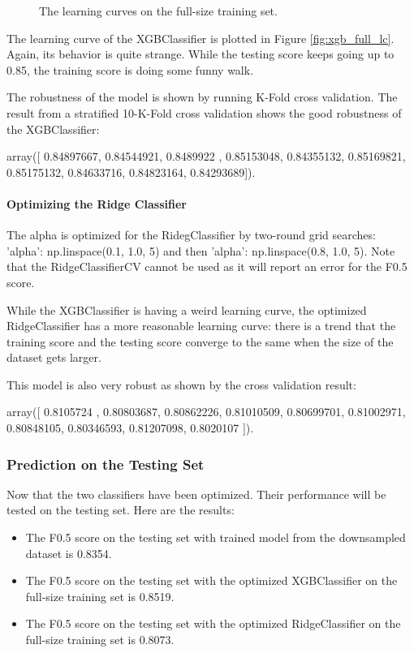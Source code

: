 \documentclass[a4paper]{article}
\begin{document}
\begin{figure}
\begin{subfigure}[b]{0.51\textwidth}
				\end{subfigure}				
				\caption{The learning curves on the full-size training set.}
				\label{fig:lc_full}
			\end{figure}					
			
			The learning curve of the XGBClassifier is plotted in Figure \ref{fig:xgb_full_lc}. Again, its behavior is quite strange. While the testing score keeps going up to ~ 0.85, the training score is doing some funny walk. 
			
			The robustness of the model is shown by running K-Fold cross validation. The result from a stratified 10-K-Fold cross validation shows the good robustness of the XGBClassifier:
			
			array([ 0.84897667,  0.84544921,  0.8489922 ,  0.85153048,  0.84355132,
			0.85169821,  0.85175132,  0.84633716,  0.84823164,  0.84293689]).
			
			\paragraph{Optimizing the Ridge Classifier}
			The alpha is optimized for the RidegClassifier by two-round grid searches: {'alpha': np.linspace(0.1, 1.0, 5)} and then {'alpha': np.linspace(0.8, 1.0, 5)}. Note that the RidgeClassifierCV cannot be used as it will report an error for the F0.5 score.			
			
			While the XGBClassifier is having a weird learning curve, the optimized RidgeClassifier has a more reasonable learning curve: there is a trend that the training score and the testing score converge to the same when the size of the dataset gets larger. 
			
			This model is also very robust as shown by the cross validation result:
			
			array([ 0.8105724 ,  0.80803687,  0.80862226,  0.81010509,  0.80699701,
			0.81002971,  0.80848105,  0.80346593,  0.81207098,  0.8020107 ]).
			
			\subsubsection{Prediction on the Testing Set}
			Now that the two classifiers have been optimized. Their performance will be tested on the testing set. Here are the results:
			
			\begin{itemize}
				\item The F0.5 score on the testing set with trained model from the downsampled dataset is 0.8354.
				\item The F0.5 score on the testing set with the optimized XGBClassifier on the full-size training set is 0.8519.
				\item The F0.5 score on the testing set with the optimized RidgeClassifier on the full-size training set is 0.8073.
			\end{itemize}
			
\end{document}
